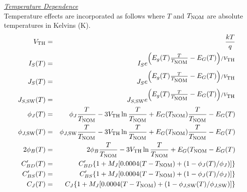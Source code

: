 \noindent\underline{\sl \large Temperature Dependence}
\\[0.1in]
Temperature effects are incorporated as follows where $T$ and $T_{\mbox{\scriptsize NOM}}$
are absolute temperatures in Kelvins (K).
\begin{eqnarray}
V_{\mbox{\scriptsize TH}} & = & {{kT} \over q}\\
I_S (T) & = & I_S e^{\left( \textstyle E_g(T) {T \over {T_{\mbox{\scriptsize NOM}}}}
 - E_G(T) \right) /V_{\mbox{\scriptsize TH}}}\\
J_S (T) & = & J_S e^{\left(\textstyle E_g(T) {T \over {T_{\mbox{\scriptsize NOM}}}}
 - E_G(T) \right) /V_{\mbox{\scriptsize TH}}}\\
J_{S,{\mbox{\scriptsize SW}}} (T) & = & J_{S,{\mbox{\scriptsize SW}}} e^{\left(\textstyle E_g(T) {T \over {T_{\mbox{\scriptsize NOM}}}}
 - E_G(T) \right) /V_{\mbox{\scriptsize TH}}}\\
\phi_J (T) & = & \phi_J {T \over {T_{\mbox{\scriptsize NOM}}}} - 3V_{\mbox{\scriptsize TH}} \ln{
                {T \over {T_{\mbox{\scriptsize NOM}}}} } + E_G (T_{\mbox{\scriptsize NOM}})
                {T \over {T_{\mbox{\scriptsize NOM}}}} -E_G(T)\\
\phi_{J,{\mbox{\scriptsize SW}}} (T) & = & \phi_{J,{\mbox{\scriptsize SW}}} {T \over {T_{\mbox{\scriptsize NOM}}}}
 - 3V_{\mbox{\scriptsize TH}} \ln{ {T \over {T_{\mbox{\scriptsize NOM}}}} }
              + E_G (T_{\mbox{\scriptsize NOM}}) {T \over {T_{\mbox{\scriptsize NOM}}}} -E_G(T)\\
2\phi_B (T) & = & 2\phi_B
                {T \over {T_{\mbox{\scriptsize NOM}}}} - 3V_{\mbox{\scriptsize TH}}
                \ln{ {T \over {T_{\mbox{\scriptsize NOM}}}} } + E_G (T_{\mbox{\scriptsize NOM}} -E_G(T)\\
C'_{BD} (T) & = & C'_{BD} \{1 + M_J [0.0004(T-T_{\mbox{\scriptsize NOM}})+(1-\phi_J (T)/\phi_J )]\} \\
C'_{BS} (T) & = & C'_{BS} \{1 + M_J [0.0004(T-T_{\mbox{\scriptsize NOM}})+(1-\phi_J (T)/\phi_J )]\} \\
C_J (T) & = & C_J \{1 + M_J [0.0004(T-T_{\mbox{\scriptsize NOM}})+(1-\phi_{J,{\mbox{\scriptsize SW}}} (T)/\phi_{J,{\mbox{\scriptsize SW}}} )]\}
\end{eqnarray}

